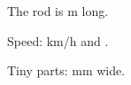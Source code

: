 \documentclass{article}
\begin{document}
The rod is \unit[2]{m} long.

Speed: \unit[3]{km/h} and .

Tiny parts: \unit[5]{mm} wide.
\end{document}
